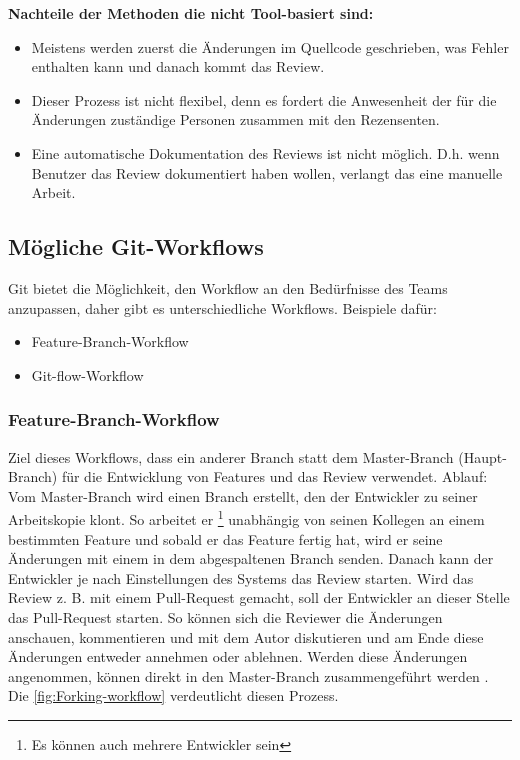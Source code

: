 \textbf{Nachteile der Methoden die nicht Tool-basiert sind:}
\begin{itemize}
	\item Meistens werden zuerst die Änderungen im Quellcode geschrieben, was Fehler enthalten kann und danach kommt das Review.
	\item Dieser Prozess ist nicht flexibel, denn es fordert die Anwesenheit der für die Änderungen zuständige Personen zusammen mit den Rezensenten.
	\item Eine automatische Dokumentation des Reviews ist nicht möglich. D.h. wenn Benutzer das Review dokumentiert haben wollen, verlangt das eine manuelle Arbeit.
\end{itemize}

\subsection{Mögliche Git-Workflows}
\label{sec:Git-Workflows}

Git bietet die Möglichkeit, den Workflow an den Bedürfnisse des Teams anzupassen, daher gibt es unterschiedliche Workflows. Beispiele dafür:

\begin{itemize}
	\item Feature-Branch-Workflow
	\item Git-flow-Workflow
\end{itemize}

\subsubsection{Feature-Branch-Workflow}
\label{subsubsec:Feature-Branch-Workflow}

Ziel dieses Workflows, dass ein anderer Branch statt dem Master-Branch (Haupt-Branch) für die Entwicklung von Features und das Review verwendet.
Ablauf: Vom Master-Branch wird einen Branch erstellt, den der Entwickler zu seiner Arbeitskopie klont. So arbeitet er \footnote{Es können auch mehrere Entwickler sein} unabhängig von seinen Kollegen an einem bestimmten Feature und 		sobald er das Feature fertig hat, wird er seine Änderungen mit einem  in dem abgespaltenen Branch senden. Danach kann der Entwickler je nach Einstellungen des Systems das 	Review starten. Wird das Review z. B. mit einem Pull-Request gemacht, soll der Entwickler an dieser Stelle das Pull-Request starten. So können sich die Reviewer die 				Änderungen anschauen, kommentieren und mit dem Autor diskutieren und am Ende diese Änderungen entweder annehmen oder ablehnen. Werden diese Änderungen angenommen, können direkt in 		den Master-Branch zusammengeführt werden \cite{Feature-Branch-Workflow}. Die \cref{fig:Forking-workflow} verdeutlicht diesen Prozess. 

